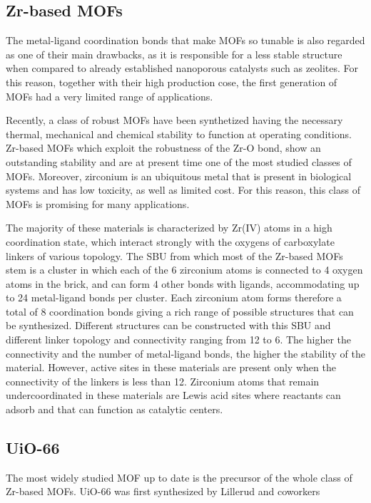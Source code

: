 \subsection*{Zr-based MOFs}
The metal-ligand coordination bonds that make MOFs so tunable is also regarded as one of their main drawbacks, as it is responsible for a less stable structure when compared to already established nanoporous catalysts such as zeolites. For this reason, together with their high production cose, the first generation of MOFs had a very limited range of applications. 

Recently, a class of robust MOFs have been synthetized having the necessary thermal, mechanical and chemical stability to function at operating conditions. Zr-based MOFs  which exploit the robustness of the Zr-O bond, show an outstanding stability and are at present time one of the most studied classes of MOFs. Moreover, zirconium is an ubiquitous metal that is present in biological systems and has low toxicity, as well as limited cost. For this reason, this class of MOFs is promising for many applications.

The majority of these materials is characterized by Zr(IV) atoms in a high coordination state, which interact strongly with the oxygens of carboxylate linkers of various topology. The SBU from which most of the Zr-based MOFs stem is a  cluster in which each of the 6 zirconium atoms is connected to 4 oxygen atoms in the brick, and can form 4 other bonds with ligands, accommodating up to 24 metal-ligand bonds per cluster. Each zirconium atom forms therefore a total of 8 coordination bonds giving a rich range of possible structures that can be synthesized. Different structures can be constructed with this SBU and different linker topology and connectivity ranging from 12 to 6. The higher the connectivity and the number of metal-ligand bonds, the higher the stability of the material. However, active sites in these materials are present only when the connectivity of the linkers is less than 12. Zirconium atoms that remain undercoordinated in these materials are Lewis acid sites where reactants can adsorb and that can function as catalytic centers.
 
\subsection*{UiO-66}
The most widely studied MOF up to date is the precursor of the whole class of Zr-based MOFs. UiO-66 was first synthesized by Lillerud and coworkers  

